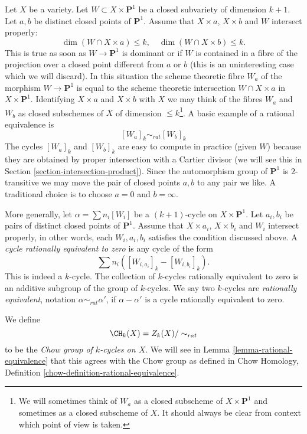 \medskip\noindent
Let $X$ be a variety. Let $W \subset X \times \mathbf{P}^1$
be a closed subvariety of dimension $k + 1$. Let $a, b$ be distinct closed
points of $\mathbf{P}^1$. Assume that $X \times a$, $X \times b$ and $W$
intersect properly:
$$
\dim (W \cap X \times a) \leq k,\quad
\dim (W \cap X \times b) \leq k.
$$
This is true as soon as $W \to \mathbf{P}^1$ is dominant or if $W$ is
contained in a fibre of the projection over a closed point different from
$a$ or $b$ (this is an uninteresting case which we will discard). In this
situation the scheme theoretic fibre $W_a$ of the morphism
$W \to \mathbf{P}^1$ is equal to the scheme theoretic intersection
$W \cap X \times a$ in $X \times \mathbf{P}^1$. Identifying $X \times a$
and $X \times b$ with $X$ we may think of the fibres $W_a$ and $W_b$
as closed subschemes of $X$ of dimension $\leq k$\footnote{We will sometimes
think of $W_a$ as a closed subscheme of $X \times \mathbf{P}^1$ and sometimes
as a closed subscheme of $X$. It should always be clear from context which
point of view is taken.}. A basic example of a
rational equivalence is
$$
[W_a]_k \sim_{rat} [W_b]_k
$$
The cycles $[W_a]_k$ and $[W_b]_k$ are easy to compute in practice
(given $W$) because they are obtained by proper intersection with
a Cartier divisor (we will see this in
Section \ref{section-intersection-product}).
Since the automorphism group of $\mathbf{P}^1$ is $2$-transitive we may
move the pair of closed points $a, b$ to any pair we like. A traditional
choice is to choose $a = 0$ and $b = \infty$.

\medskip\noindent
More generally, let $\alpha = \sum n_i [W_i]$ be a $(k + 1)$-cycle on
$X \times \mathbf{P}^1$.  Let $a_i, b_i$ be pairs of distinct closed points of
$\mathbf{P}^1$. Assume that $X \times a_i$, $X \times b_i$ and $W_i$ intersect
properly, in other words, each $W_i, a_i, b_i$ satisfies the condition
discussed above. A {\it cycle rationally equivalent to zero} is any cycle
of the form
$$
\sum n_i([W_{i, a_i}]_k - [W_{i, b_i}]_k).
$$
This is indeed a $k$-cycle. The collection of $k$-cycles rationally
equivalent to zero is an additive subgroup of the group of $k$-cycles.
We say two $k$-cycles are {\it rationally equivalent}, notation
$\alpha \sim_{rat} \alpha'$, if $\alpha - \alpha'$ is a cycle rationally
equivalent to zero.

\medskip\noindent
We define
$$
\CH_k(X) = Z_k(X)/ \sim_{rat}
$$
to be the {\it Chow group of $k$-cycles on $X$}. We will see in
Lemma \ref{lemma-rational-equivalence}
that this agrees with the Chow group as defined in
Chow Homology, Definition \ref{chow-definition-rational-equivalence}.


